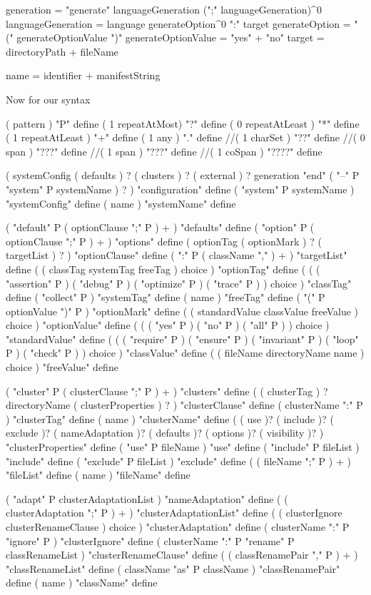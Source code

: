 generation = "generate" languageGeneration (";" languageGeneration)^0
languageGeneration = language generateOption^0 ":" target
generateOption = "(" generateOptionValue ")"
generateOptionValue = "yes" + "no"
target = directoryPath + fileName

name = identifier + manifestString
\stoptyping

Now for our syntax

\startJoylolCode
( pattern ) "P" define
( 1 repeatAtMost) "?" define
( 0 repeatAtLeast ) "*" define
( 1 repeatAtLeast ) "+" define
( 1 any ) "." define
//( 1 charSet ) "??" define
//( 0 span ) "???" define
//( 1 span ) "???" define
//( 1 coSpan ) "????" define
\stopJoylolCode

\startJoylolCode
(
  systemConfig
  ( defaults ) ?
  ( clusters ) ?
  ( external ) ?
  generation
  "end" ( "--" P "system" P systemName ) ?
) "configuration" define
( "system" P systemName ) "systemConfig" define
( name ) "systemName" define

( "default" P ( optionClause ";" P ) + ) "defaults" define
( "option"  P ( optionClause ";" P ) + ) "options" define
( 
  optionTag 
  ( optionMark ) ? 
  ( targetList ) ?
) "optionClause" define
( ":" P ( className "," ) + ) "targetList" define
( ( classTag systemTag freeTag ) choice ) "optionTag" define
(
  ( 
    ( "assertion" P )
    ( "debug" P )
    ( "optimize" P )
    ( "trace" P )
  ) choice
) "classTag" define
( "collect" P ) "systemTag" define
( name ) "freeTag" define
( "(" P optionValue ")" P ) "optionMark" define
( ( standardValue classValue freeValue ) choice ) "optionValue" define
(
  ( 
    ( "yes" P )
    ( "no" P )
    ( "all" P )
  ) choice
) "standardValue" define
(
  ( 
    ( "require" P )
    ( "ensure" P )
    ( "invariant" P )
    ( "loop" P )
    ( "check" P )
  ) choice
) "classValue" define
( ( fileName directoryName name ) choice ) "freeValue" define

( "cluster" P ( clusterClause ";" P ) + ) "clusters" define
( 
  ( clusterTag ) ?
  directoryName 
  ( clusterProperties ) ?
) "clusterClause" define
( clusterName ":" P ) "clusterTag" define
( name ) "clusterName" define
(
  ( use )?
  ( include )?
  ( exclude )?
  ( nameAdaptation )?
  ( defaults )?
  ( options )?
  ( visibility )?
) "clusterProperties" define
( "use" P fileName ) "use" define
( "include" P fileList ) "include" define
( "exclude" P fileList ) "exclude" define
( ( fileName ";" P ) + ) "fileList" define
( name ) "fileName" define

( "adapt" P clusterAdaptationList ) "nameAdaptation" define
( ( clusterAdaptation ";" P ) + ) "clusterAdaptationList" define
( ( clusterIgnore clusterRenameClause ) choice ) "clusterAdaptation" define
( clusterName ":" P "ignore" P ) "clusterIgnore" define
( clusterName ":" P "rename" P classRenameList ) "clusterRenameClause" define
( ( classRenamePair "," P ) + ) "classRenameList" define
( className "as" P className ) "classRenamePair" define
( name ) "className" define

